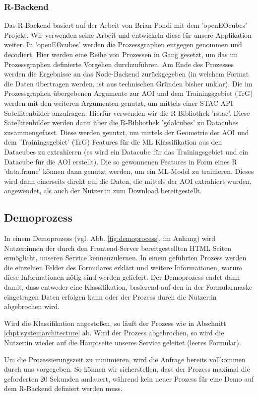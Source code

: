 \documentclass[a4paper,12pt]{article}
\begin{document}
\subsubsection{R-Backend}
Das R-Backend basiert auf der Arbeit von Brian Pondi mit dem 'openEOcubes' Projekt. Wir verwenden seine Arbeit und entwickeln diese für unsere Applikation weiter.
In 'openEOcubes' werden die Prozessgraphen entgegen genommen und decodiert. Hier werden eine Reihe von Prozessen in Gang gesetzt, um das im Prozessgraphen definierte Vorgehen durchzuführen. Am Ende des Prozesses werden die Ergebnisse an das Node-Backend zurückgegeben (in welchem Format die Daten übertragen werden, ist aus technischen Gründen bisher unklar).
Die im Prozessgraphen übergebenen Argumente zur AOI und dem Trainingsgebiet (TrG) werden mit den weiteren Argumenten genutzt, um mittels einer STAC API Satellitenbilder anzufragen. Hierfür verwenden wir die R Bibliothek 'rstac'. Diese Satellitenbilder werden dann über die R-Bibliothek 'gdalcubes' zu Datacubes zusammengefasst. Diese werden genutzt, um mittels der Geometrie der AOI und dem 'Trainingsgebiet' (TrG) Features für die  ML Klassifikation aus den Datacubes zu extrahieren (es wird ein Datacube für das Trainingsgebiet und ein Datacube für die AOI erstellt).
Die so gewonnenen Features in Form eines R 'data.frame' können dann genutzt werden, um ein ML-Model zu trainieren. Dieses wird dann einerseits direkt auf die Daten, die mittels der AOI extrahiert wurden, angewendet, als auch der Nutzer:in zum Download bereitgestellt.





\subsection{Demoprozess}
In einem Demoprozess (vgl. Abb. \ref{fig:demoprocess}, im Anhang) wird Nutzer:innen der durch den Frontend-Server bereitgestellten HTML Seiten ermöglicht, unseren Service kennenzulernen. In einem geführten Prozess werden die einzelnen Felder des Formulares erklärt und weitere Informationen, warum diese Informationen nötig sind werden geliefert. Der Demoprozess endet dann damit, dass entweder eine Klassifikation, basierend auf den in der Formularmaske eingetragen Daten erfolgen kann oder der Prozess durch die Nutzer:in abgebrochen wird.
\par
Wird die Klassifikation angestoßen, so läuft der Prozess wie in Abschnitt \ref{chpt:systemarchitecture} ab. Wird der Prozess abgebrochen, so wird die Nutzer:in wieder auf die Hauptseite unseres Service geleitet (leeres Formular).
\par
Um die Prozessierungszeit zu minimieren, wird die Anfrage bereits vollkommen durch uns vorgegeben. So können wir sicherstellen, dass der Prozess maximal die geforderten 20 Sekunden andauert, während kein neuer Prozess für eine Demo auf dem R-Backend definiert werden muss.
\end{document}
